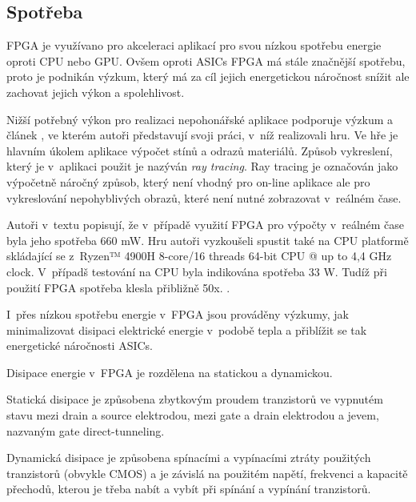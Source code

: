 \documentclass[a4paper, twoside, 11pt]{article}
\newcommand{\fbar}{\FloatBarrier}
\begin{document}
		\fbar
		\subsection{Spotřeba}
			FPGA je využívano pro akceleraci aplikací pro svou nízkou spotřebu energie oproti CPU nebo GPU. Ovšem oproti ASICs FPGA má stále značnější spotřebu, proto je podnikán výzkum, který má za cíl jejich energetickou náročnost snížit ale zachovat jejich výkon a spolehlivost.\par
			Nižší potřebný výkon pro realizaci nepohonářské aplikace podporuje výzkum a článek \cite{rovere-sphery-vs-shapes}, ve kterém autoři představují svoji práci, v~níž realizovali hru. Ve hře je hlavním úkolem aplikace výpočet stínů a odrazů materiálů. Způsob vykreslení, který je v~aplikaci použit je nazýván \textit{ray tracing}. Ray tracing je označován jako výpočetně náročný způsob, který není vhodný pro on-line aplikace ale pro vykreslování nepohyblivých obrazů, které není nutné zobrazovat v~reálném čase. \cite{wikipedia-ray-tracing}\par
			Autoři v~textu popisují, že v~případě využití FPGA pro výpočty v~reálném čase byla jeho spotřeba 660 mW. Hru autoři vyzkoušeli spustit také na CPU platformě skládající se z~Ryzen™️ 4900H 8-core/16 threads 64-bit CPU @ up to 4,4 GHz clock. V~případš testování na CPU byla indikována spotřeba 33 W. Tudíž při použití FPGA spotřeba klesla přibližně 50x. \cite{rovere-sphery-vs-shapes}.\par
			I~přes nízkou spotřebu energie v~FPGA jsou prováděny výzkumy, jak minimalizovat disipaci elektrické energie v~podobě tepla a přiblížit se tak energetické náročnosti ASICs.\par
			Disipace energie v~FPGA je rozdělena na statickou a dynamickou.\par
			Statická disipace je způsobena zbytkovým proudem tranzistorů ve vypnutém stavu mezi drain a source elektrodou, mezi gate a drain elektrodou a jevem, nazvaným gate direct-tunneling. \cite{grover-reduction-of-power-consumption}\par
			Dynamická disipace je způsobena spínacími a vypínacími ztráty použitých tranzistorů (obvykle CMOS) a je závislá na použitém napětí, frekvenci a kapacitě přechodů, kterou je třeba nabít a vybít při spínání a vypínání tranzistorů. \cite{grover-reduction-of-power-consumption}
\end{document}
